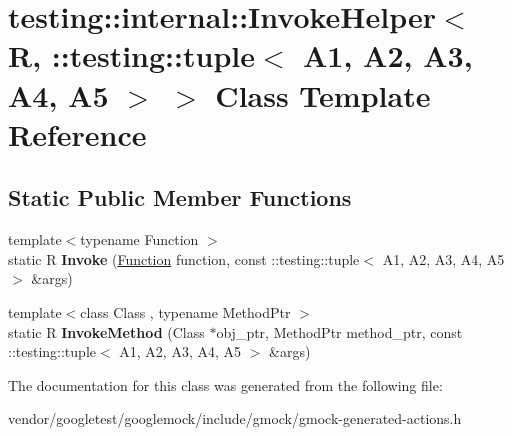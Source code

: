 \hypertarget{classtesting_1_1internal_1_1_invoke_helper_3_01_r_00_01_1_1testing_1_1tuple_3_01_a1_00_01_a2_00_5dd6c0827e45a39a81d93a14211e2a19}{}\section{testing\+:\+:internal\+:\+:Invoke\+Helper$<$ R, \+:\+:testing\+:\+:tuple$<$ A1, A2, A3, A4, A5 $>$ $>$ Class Template Reference}
\label{classtesting_1_1internal_1_1_invoke_helper_3_01_r_00_01_1_1testing_1_1tuple_3_01_a1_00_01_a2_00_5dd6c0827e45a39a81d93a14211e2a19}
\subsection*{Static Public Member Functions}
\begin{DoxyCompactItemize}
\item 
\mbox{\label{classtesting_1_1internal_1_1_invoke_helper_3_01_r_00_01_1_1testing_1_1tuple_3_01_a1_00_01_a2_00_5dd6c0827e45a39a81d93a14211e2a19_a1458b05a4c61bc51ae99f586c6d070b8}} 
{\footnotesize template$<$typename Function $>$ }\\static R {\bfseries Invoke} (\mbox{\hyperlink{structtesting_1_1internal_1_1_function}{Function}} function, const \+::testing\+::tuple$<$ A1, A2, A3, A4, A5 $>$ \&args)
\item 
\mbox{\label{classtesting_1_1internal_1_1_invoke_helper_3_01_r_00_01_1_1testing_1_1tuple_3_01_a1_00_01_a2_00_5dd6c0827e45a39a81d93a14211e2a19_a5748d33ebff032886c73d88f4b511d87}} 
{\footnotesize template$<$class Class , typename Method\+Ptr $>$ }\\static R {\bfseries Invoke\+Method} (Class $\ast$obj\+\_\+ptr, Method\+Ptr method\+\_\+ptr, const \+::testing\+::tuple$<$ A1, A2, A3, A4, A5 $>$ \&args)
\end{DoxyCompactItemize}


The documentation for this class was generated from the following file\+:\begin{DoxyCompactItemize}
\item 
vendor/googletest/googlemock/include/gmock/gmock-\/generated-\/actions.\+h\end{DoxyCompactItemize}

